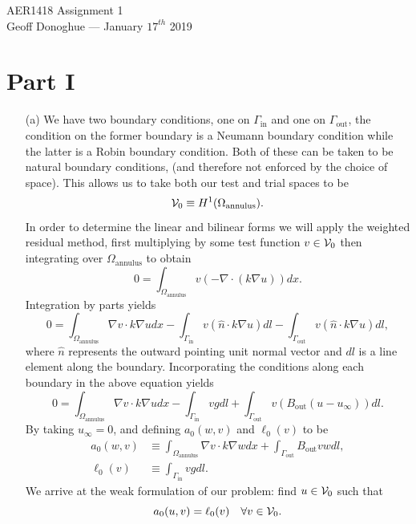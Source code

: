 \documentclass{article}
\begin{document}
	\begin{center}
		\LARGE AER1418 Assignment 1 \\
		\normalsize Geoff Donoghue --- January \(17^{th}\) 2019
	\end{center}

\section*{Part I}
\begin{itemize}
	\item[(a)] We have two boundary conditions, one on \(\Gamma_\text{in} \) and one on \(\Gamma_\text{out} \), the condition on the former boundary is a Neumann boundary condition while the latter is a Robin boundary condition. Both of these can be taken to be natural boundary conditions, (and therefore not enforced by the choice of space). This allows us to take both our test and trial spaces to be 
	\begin{equation}
		\mathcal{V}_0 \equiv H^1(\Omega_\text{annulus}).
	\end{equation}
	In order to determine the linear and bilinear forms we will apply the weighted residual method, first multiplying by some test function \(v \in \mathcal{V}_0\) then integrating over \(\Omega_\text{annulus} \) to obtain
	\begin{equation}
		0 = \int_{\Omega_\text{annulus}} v \left( -\nabla \cdot \left(k\nabla u \right)\right) dx.
	\end{equation}
	Integration by parts yields
	\begin{equation}
		0 = \int_{\Omega_\text{annulus}} \nabla v \cdot k\nabla u dx - \int_{\Gamma_\text{in}} v\left(\hat{n} \cdot k\nabla u \right)dl - \int_{\Gamma_\text{out}} v\left(\hat{n} \cdot k\nabla u \right)dl,
	\end{equation}
	where \(\hat{n}\) represents the outward pointing unit normal vector and \(dl\) is a line element along the boundary. Incorporating the conditions along each boundary in the above equation yields
	\begin{equation}
		0 = \int_{\Omega_\text{annulus}} \nabla v \cdot k\nabla u dx - \int_{\Gamma_\text{in}} vg dl + \int_{\Gamma_\text{out}} v\left(B_\text{out}\left(u - u_\infty \right) \right)dl.
	\end{equation}
	By taking \(u_\infty = 0\), and defining \(a_0(w,v)\) and \(\ell_0(v)\) to be
	\begin{align}
		a_0(w,v) &\equiv \int_{\Omega_\text{annulus}} \nabla v \cdot k\nabla w dx + \int_{\Gamma_\text{out}} B_\text{out}vw dl,\\
		\ell_0(v) &\equiv \int_{\Gamma_\text{in}} vgdl.
	\end{align}
	We arrive at the weak formulation of our problem: find \(u \in \mathcal{V}_0\) such that
	\begin{equation}
		a_0(u,v) = \ell_0(v) \quad \forall v \in \mathcal{V}_0.
	\end{equation}
	

\end{itemize}
\end{document}
